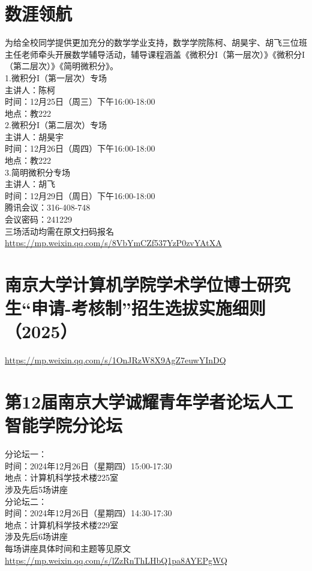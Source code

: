 \documentclass[letterpaper, 12pt]{article}
\begin{document}
\begin{multicols}{2}
\section{数涯领航}
为给全校同学提供更加充分的数学学业支持，数学学院陈柯、胡昊宇、胡飞三位班主任老师牵头开展数学辅导活动，辅导课程涵盖《微积分I（第一层次）》《微积分I（第二层次）》《简明微积分》。\\
1.微积分I（第一层次）专场\\
主讲人：陈柯\\
时间：12月25日（周三）下午16:00-18:00\\
地点：教222\\
2.微积分I（第二层次）专场\\
主讲人：胡昊宇\\
时间：12月26日（周四）下午16:00-18:00\\
地点：教222\\
3.简明微积分专场\\
主讲人：胡飞\\
时间：12月29日（周日）下午16:00-18:00\\
腾讯会议：316-408-748\\
会议密码：241229\\
三场活动均需在原文扫码报名\url{https://mp.weixin.qq.com/s/8VbYmCZf537YzP0zvYAtXA}\\

\section{南京大学计算机学院学术学位博士研究生“申请-考核制”招生选拔实施细则（2025）}
\url{https://mp.weixin.qq.com/s/1OnJRzW8X9AgZ7euwYInDQ}

\section{第12届南京大学诚耀青年学者论坛人工智能学院分论坛}
分论坛一：\\
时间：2024年12月26日（星期四）15:00-17:30\\
地点：计算机科学技术楼225室\\
涉及先后5场讲座\\
分论坛二：\\
时间：2024年12月26日（星期四）14:30-17:30\\
地点：计算机科学技术楼229室\\
涉及先后6场讲座\\
每场讲座具体时间和主题等见原文\url{https://mp.weixin.qq.com/s/lZzRnThLHbQ1pa8AYEPgWQ}\\


\end{multicols}
\end{document}
